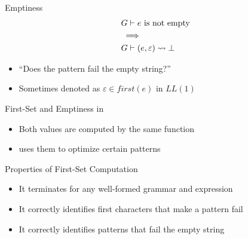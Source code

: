 \documentclass{beamer}
\begin{document}
\begin{frame}{Emptiness}
    \begin{align*}
        & \text{$G \vdash e$ is not empty} \\
        & \implies \\
        & G \vdash (e, \varepsilon) \rightsquigarrow \bot
    \end{align*}
    \begin{itemize}
        \item ``Does the pattern fail the empty string?''
        \item Sometimes denoted as $\varepsilon \in first(e)$ in $LL(1)$
    \end{itemize}
\end{frame}

\begin{frame}{First-Set and Emptiness in \lpeg{}}
    \begin{itemize}
        \item Both values are computed by the same function
        \item \lpeg{} uses them to optimize certain patterns
    \end{itemize}
\end{frame}

\begin{frame}{Properties of First-Set Computation}
    \begin{itemize}
        \item It terminates for any well-formed grammar and expression
        \item It correctly identifies first characters that make a pattern fail
        \item It correctly identifies patterns that fail the empty string
    \end{itemize}
\end{frame}
\end{document}
